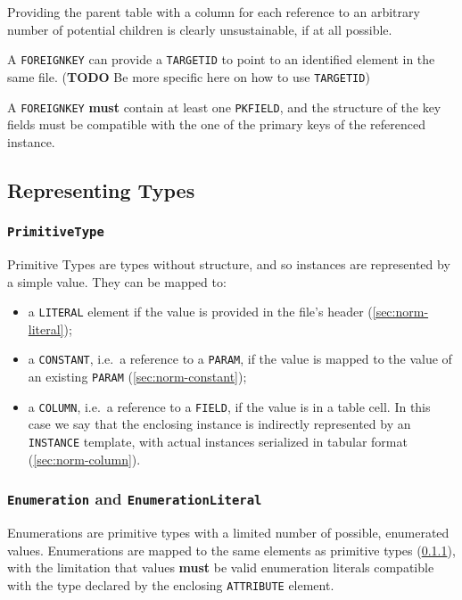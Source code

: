 \documentclass[11pt,a4paper]{ivoa}
\begin{document}
Providing the parent table with a column for each reference to an
arbitrary number of potential children is clearly unsustainable, if at
all possible.

A \texttt{FOREIGNKEY} can provide a \texttt{TARGETID} to point to an
identified element in the same file. (\textbf{TODO} Be more specific
here on how to use \texttt{TARGETID})

A \texttt{FOREIGNKEY} \textbf{must} contain at least one
\texttt{PKFIELD}, and the structure of the key fields must be compatible
with the one of the primary keys of the referenced instance.

\subsection{Representing Types}\label{sec:norm-types}

\subsubsection{\textbf{\texttt{PrimitiveType}}}\label{sec:norm-map-primitive}

Primitive Types are types without structure, and so instances are
represented by a simple value. They can be mapped to:

\begin{itemize}
\itemsep1pt\parskip0pt
\item
  a \texttt{LITERAL} element if the value is provided in the file's
  header (\ref{sec:norm-literal});
\item
  a \texttt{CONSTANT}, i.e.~a reference to a \texttt{PARAM}, if the
  value is mapped to the value of an existing \texttt{PARAM}
  (\ref{sec:norm-constant});
\item
  a \texttt{COLUMN}, i.e.~a reference to a \texttt{FIELD}, if the value
  is in a table cell. In this case we say that the enclosing instance is
  indirectly represented by an \texttt{INSTANCE} template, with actual
  instances serialized in tabular format (\ref{sec:norm-column}).
\end{itemize}

\subsubsection{\textbf{\texttt{Enumeration}} and
\textbf{\texttt{EnumerationLiteral}}}\label{sec:norm-map-enumeration}

Enumerations are primitive types with a limited number of possible,
enumerated values. Enumerations are mapped to the same elements as
primitive types (\ref{sec:norm-map-primitive}), with the limitation
that values \textbf{must} be valid enumeration literals compatible with
the type declared by the enclosing \texttt{ATTRIBUTE} element.
\end{document}
